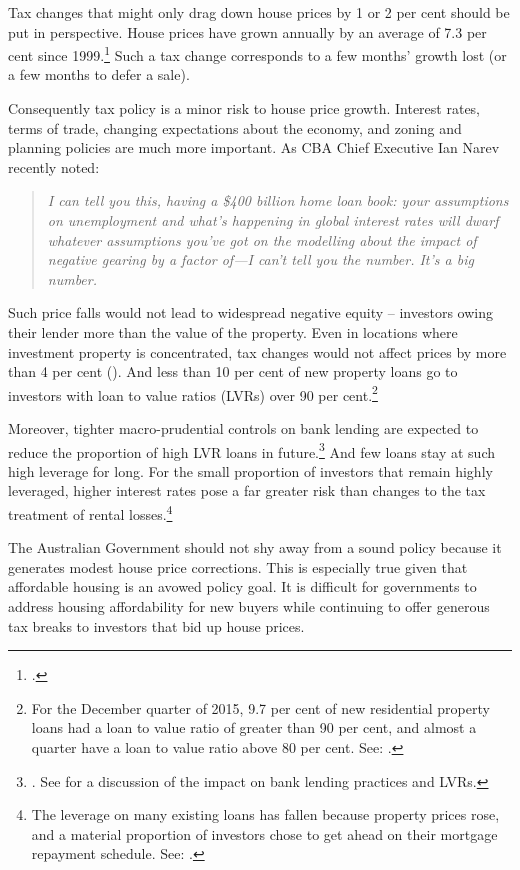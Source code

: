 Tax changes that might only drag down house prices by 1 or 2 per cent should be put in perspective. House prices have grown annually by an average of 7.3 per cent since 1999.\footcites{ABS2015ResidentialPropertyIndex}{Yates2011}
Such a tax change corresponds to a few months’ growth lost (or a few months to defer a sale).

Consequently tax policy is a minor risk to house price growth.  Interest rates, terms of trade, changing expectations about the economy, and zoning and planning policies are much more important. As CBA Chief Executive Ian Narev recently noted:

\begin{quote} 
\textit{I can tell you this, having a \$400 billion home loan book: your assumptions on unemployment and what's happening in global interest rates will dwarf whatever assumptions you've got on the modelling about the impact of negative gearing by a factor of---I can't tell you the number. It's a big number.}
\end{quote}

Such price falls would not lead to widespread negative equity – investors owing their lender more than the value of the property. Even in locations where investment property is concentrated, tax changes would not affect prices by more than 4 per cent (). And less than 10 per cent of new property loans go to investors with loan to value ratios (LVRs) over 90 per cent.\footnote{For the December quarter of 2015, 9.7 per cent of new residential property loans had a loan to value ratio of greater than 90 per cent, and almost a quarter have a loan to value ratio above 80 per cent. See: \textcite{APRA2016PropertyExposures}.}

Moreover, tighter macro-prudential controls on bank lending are expected to reduce the proportion of high LVR loans in future.\footnote{\textcite{APRA2014a}. See \textcite{Schlesinger2015} for a discussion of the impact on bank lending practices and LVRs.}  
  And few loans stay at such high leverage for long.  For the small proportion of investors that remain highly leveraged, higher interest rates pose a far greater risk than changes to the tax treatment of rental losses.\footnote{The leverage on many existing loans has fallen because property prices rose, and a material proportion of investors chose to get ahead on their mortgage repayment schedule. See: \textcite{RBA2015StatsMarginLending}.} 

The Australian Government should not shy away from a sound policy because it generates modest house price corrections. 
This is especially true given that affordable housing is an avowed policy goal. It is difficult for governments to address housing affordability for new buyers while continuing to offer generous tax breaks to investors that bid up house prices. 


